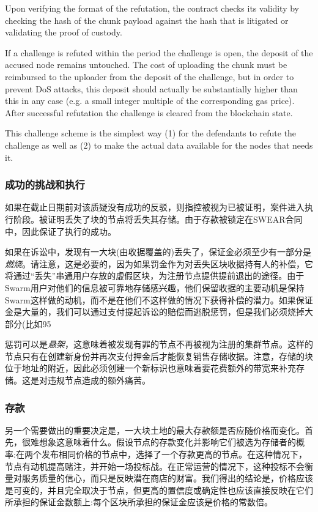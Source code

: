 Upon verifying the format of the refutation, the contract checks its validity by checking the hash of the chunk payload against the hash that is litigated or validating the proof of custody. 

If a challenge is refuted within the period the challenge is open, the deposit of the accused node remains untouched. The cost of uploading the chunk must be reimbursed to the uploader from the deposit of the challenge, but in order to prevent DoS attacks, this deposit should actually be substantially higher than this in any case (e.g. a small integer multiple of the corresponding gas price). After successful refutation the challenge is cleared from the blockchain state.

This challenge scheme is the simplest way (1) for the defendants to refute the challenge as well as (2) to make the actual data available for the nodes that needs it.

\subsubsection{成功的挑战和执行}

如果在截止日期前对该质疑没有成功的反驳，则指控被视为已被证明，案件进入执行阶段。被证明丢失了块的节点将丢失其存储。由于存款被锁定在SWEAR合同中，因此保证了执行的成功。

如果在诉讼中，发现有一大块(由收据覆盖的)丢失了，保证金必须至少有一部分是\emph{燃烧}。请注意，这是必要的，因为如果罚金作为对丢失区块收据持有人的补偿，它将通过“丢失”串通用户存放的虚假区块，为注册节点提供提前退出的途径。由于Swarm用户对他们的信息被可靠地存储感兴趣，他们保留收据的主要动机是保持Swarm这样做的动机，而不是在他们不这样做的情况下获得补偿的潜力。如果保证金是大量的，我们可以通过支付提起诉讼的赔偿而逃脱惩罚，但是我们必须烧掉大部分(比如95%

惩罚可以是\emph{悬架}，这意味着被发现有罪的节点不再被视为注册的集群节点。这样的节点只有在创建新身份并再次支付押金后才能恢复销售存储收据。注意，存储的块位于地址的附近，因此必须创建一个新标识也意味着要花费额外的带宽来补充存储。这是对违规节点造成的额外痛苦。


\subsubsection{存款}

另一个需要做出的重要决定是，一大块土地的最大存款额是否应随价格而变化。首先，很难想象这意味着什么。假设节点的存款变化并影响它们被选为存储者的概率:在两个发布相同价格的节点中，选择了一个存款更高的节点。在这种情况下，节点有动机提高赌注，并开始一场投标战。在正常运营的情况下，这种投标不会衡量对服务质量的信心，而只是反映潜在商店的财富。我们得出的结论是，价格应该是可变的，并且完全取决于节点，但更高的置信度或确定性也应该直接反映在它们所承担的保证金数额上:每个区块所承担的保证金应该是价格的常数倍。

